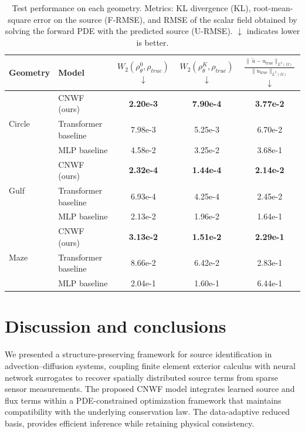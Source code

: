 \documentclass[onefignum,onetabnum]{siamart171218} %
\begin{document}
\begin{table}[t]
    \centering
    \caption{Test performance on each geometry.  
    Metrics: KL divergence (KL), root-mean-square error on the source (F-RMSE), and RMSE of the scalar field obtained by solving the forward PDE with the predicted source (U-RMSE).  $\downarrow$ indicates lower is better.}
    \label{tab:vertical_results}
    \begin{tabular}{llccc}
    \toprule
    \textbf{Geometry} & \textbf{Model}
    & $W_2(\rho_\theta^0, \rho_{true})$ $\downarrow$ & $W_2(\rho_\theta^K, \rho_{true})$ $\downarrow$ & $\frac{\bigl\|\,\tilde u-u_{\mathrm{true}}\bigr\|_{L^{2}(\Omega)}}
           {\bigl\|u_{\mathrm{true}}\bigr\|_{L^{2}(\Omega)}}$ $\downarrow$ \\
    \midrule
    \multirow{3}{*}{Circle}%
        & CNWF (ours) & \textbf{2.20e-3} & \textbf{7.90e-4} & \textbf{3.77e-2} \\
        & Transformer baseline & 7.98e-3 & 5.25e-3 & 6.70e-2 \\
        & MLP baseline & 4.58e-2 & 3.25e-2 & 3.68e-1 \\[2pt]
        \midrule
    \multirow{3}{*}{Gulf}%
        & CNWF (ours) & \textbf{2.32e-4} & \textbf{1.44e-4} & \textbf{2.14e-2} \\
        & Transformer baseline & 6.93e-4 & 4.25e-4 & 2.45e-2 \\
        & MLP baseline & 2.13e-2 & 1.96e-2 & 1.64e-1 \\[2pt]
        \midrule
    \multirow{3}{*}{Maze}%
        & CNWF (ours) & \textbf{3.13e-2} & \textbf{1.51e-2} & \textbf{2.29e-1} \\
        & Transformer baseline & 8.66e-2 & 6.42e-2 & 2.83e-1 \\
        & MLP baseline & 2.04e-1 & 1.60e-1 & 6.44e-1 \\[2pt]
        \midrule
    \bottomrule
\end{tabular}
\end{table}

\section{Discussion and conclusions}
\label{sec:conclusions}

We presented a structure-preserving framework for source identification in advection–diffusion systems, coupling finite element exterior calculus with neural network surrogates to recover spatially distributed source terms from sparse sensor measurements. The proposed CNWF model integrates learned source and flux terms within a PDE-constrained optimization framework that maintains compatibility with the underlying conservation law. The data-adaptive reduced basis, provides efficient inference while retaining physical consistency.
\end{document}
